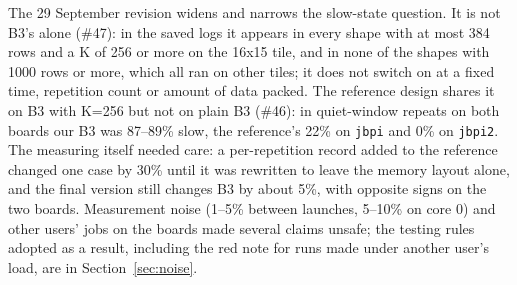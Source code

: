 \documentclass[11pt,a4paper]{article}
\begin{document}
\begin{titlepage}
\begin{minipage}{0.88\linewidth}
The 29 September revision widens and narrows the slow-state question. It is not B3's alone (\#47): in the saved logs it appears in every
shape with at most 384 rows and a K of 256 or more on the 16x15 tile, and in none of the shapes with 1000 rows or more, which all ran on
other tiles; it does not switch on at a fixed time, repetition count or amount of data packed. The reference design shares it on B3 with K=256
but not on plain B3 (\#46): in quiet-window repeats on both boards our B3 was 87--89\% slow, the reference's 22\% on \texttt{jbpi} and 0\% on
\texttt{jbpi2}. The measuring itself needed care: a per-repetition record added to the reference changed one case by 30\% until it was
rewritten to leave the memory layout alone, and the final version still changes B3 by about 5\%, with opposite signs on the two boards.
Measurement noise (1--5\% between launches, 5--10\% on core 0) and other users' jobs on the boards made several claims unsafe; the
testing rules adopted as a result, including the red note for runs made under another user's load, are in Section~\ref{sec:noise}.
\end{minipage}
\vspace{1.5cm}
\end{titlepage}

\tableofcontents
\newpage

\end{document}
